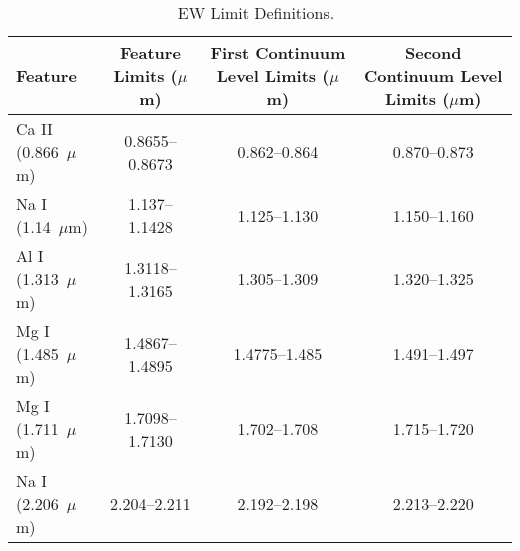 \begin{table}[H]
    \caption{EW Limit Definitions.~\label{tab:features}}
	\begin{tabular}{l c c c}
		Feature & Feature Limits ($\mu$m) & First Continuum Level Limits ($\mu$m) & Second Continuum Level Limits ($\mu$m) \\ \hline
		Ca II (0.866~$\mu$m) & 0.8655--0.8673 & 0.862--0.864 & 0.870--0.873 \\
		Na I (1.14~$\mu$m) & 1.137--1.1428 & 1.125--1.130 & 1.150--1.160 \\
		Al I (1.313~$\mu$m) & 1.3118--1.3165 & 1.305--1.309 & 1.320--1.325 \\
		Mg I (1.485~$\mu$m) & 1.4867--1.4895 & 1.4775--1.485 & 1.491--1.497 \\
		Mg I (1.711~$\mu$m) & 1.7098--1.7130 & 1.702--1.708 & 1.715--1.720 \\
		Na I (2.206~$\mu$m) & 2.204--2.211 & 2.192--2.198 & 2.213--2.220 \\
	\end{tabular}
\end{table}